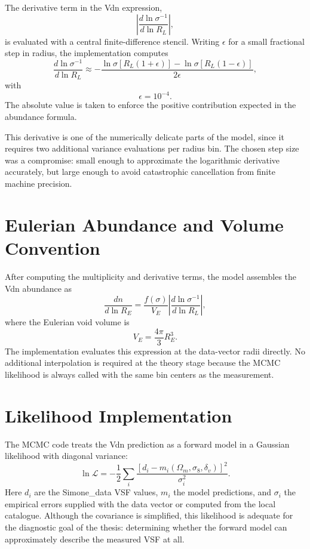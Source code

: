\documentclass[12pt]{report}
\begin{document}
The derivative term in the Vdn expression,
\begin{equation}
    \left|\frac{d\ln\sigma^{-1}}{d\ln R_L}\right|,
\end{equation}
is evaluated with a central finite-difference stencil. Writing $\epsilon$ for a small fractional step in radius, the implementation computes
\begin{equation}
    \frac{d\ln\sigma^{-1}}{d\ln R_L}
    \approx
    -\frac{\ln \sigma[R_L(1+\epsilon)] - \ln \sigma[R_L(1-\epsilon)]}{2\epsilon},
\end{equation}
with
\begin{equation}
    \epsilon = 10^{-4}.
\end{equation}
The absolute value is taken to enforce the positive contribution expected in the abundance formula.

This derivative is one of the numerically delicate parts of the model, since it requires two additional variance evaluations per radius bin. The chosen step size was a compromise: small enough to approximate the logarithmic derivative accurately, but large enough to avoid catastrophic cancellation from finite machine precision.

\section{Eulerian Abundance and Volume Convention}

After computing the multiplicity and derivative terms, the model assembles the Vdn abundance as
\begin{equation}
    \frac{dn}{d\ln R_E}
    =
    \frac{f(\sigma)}{V_E}
    \left|\frac{d\ln\sigma^{-1}}{d\ln R_L}\right|,
\end{equation}
where the Eulerian void volume is
\begin{equation}
    V_E = \frac{4\pi}{3}R_E^3.
\end{equation}
The implementation evaluates this expression at the data-vector radii directly. No additional interpolation is required at the theory stage because the MCMC likelihood is always called with the same bin centers as the measurement.

\section{Likelihood Implementation}

The MCMC code treats the Vdn prediction as a forward model in a Gaussian likelihood with diagonal variance:
\begin{equation}
    \ln \mathcal{L}
    =
    -\frac{1}{2}\sum_i
    \frac{[d_i - m_i(\Omega_m,\sigma_8,\delta_v)]^2}{\sigma_i^2}.
\end{equation}
Here $d_i$ are the Simone\_data VSF values, $m_i$ the model predictions, and $\sigma_i$ the empirical errors supplied with the data vector or computed from the local catalogue. Although the covariance is simplified, this likelihood is adequate for the diagnostic goal of the thesis: determining whether the forward model can approximately describe the measured VSF at all.
\end{document}
